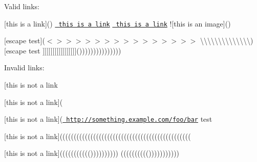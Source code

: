 Valid links\+:

\mbox{[}this is a link\mbox{]}() \href{http://something.example.com/foo/bar}{\texttt{ this is a link}} \href{http://something.example.com/foo/bar}{\texttt{ this is a link}} !\mbox{[}this is an image\mbox{]}()  

\mbox{[}escape test\mbox{]}(\texorpdfstring{$<$}{<}\texorpdfstring{$>$}{>}\texorpdfstring{$>$}{>}\texorpdfstring{$>$}{>}\texorpdfstring{$>$}{>}\texorpdfstring{$>$}{>}\texorpdfstring{$>$}{>}\texorpdfstring{$>$}{>}\texorpdfstring{$>$}{>}\texorpdfstring{$>$}{>}\texorpdfstring{$>$}{>}\texorpdfstring{$>$}{>}\texorpdfstring{$>$}{>}\texorpdfstring{$>$}{>}\texorpdfstring{$>$}{>}\texorpdfstring{$>$}{>} \textquotesingle{}\textbackslash{}\textquotesingle{}\textbackslash{}\textquotesingle{}\textbackslash{}\textquotesingle{}\textbackslash{}\textquotesingle{}\textbackslash{}\textquotesingle{}\textbackslash{}\textquotesingle{}\textbackslash{}\textquotesingle{}\textbackslash{}\textquotesingle{}\textbackslash{}\textquotesingle{}\textbackslash{}\textquotesingle{}\textbackslash{}\textquotesingle{}\textbackslash{}\textquotesingle{}\textbackslash{}\textquotesingle{}\textbackslash{}\textquotesingle{}\textquotesingle{}) \mbox{[}escape test \mbox{]}\mbox{]}\mbox{]}\mbox{]}\mbox{]}\mbox{]}\mbox{]}\mbox{]}\mbox{]}\mbox{]}\mbox{]}\mbox{]}\mbox{]}\mbox{]}\mbox{]}\mbox{]}\mbox{]}()))))))))))))))

Invalid links\+:

\mbox{[}this is not a link

\mbox{[}this is not a link\mbox{]}(

\mbox{[}this is not a link\mbox{]}(\href{http://something.example.com/foo/bar}{\texttt{ http\+://something.\+example.\+com/foo/bar}} \textquotesingle{}test\textquotesingle{}

\mbox{[}this is not a link\mbox{]}(((((((((((((((((((((((((((((((((((((((((((((((

\mbox{[}this is not a link\mbox{]}((((((((((()))))))))) (((((((((())))))))))) 